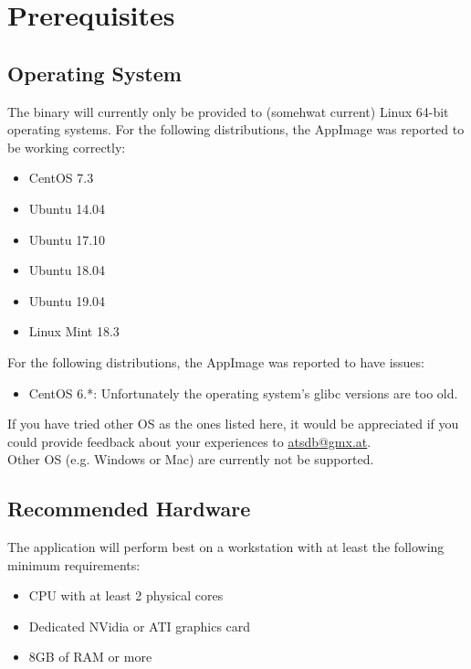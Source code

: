\section{Prerequisites}

\subsection{Operating System}

The binary will currently only be provided to (somehwat current) Linux 64-bit operating systems. For the following distributions, the AppImage was reported to be working correctly:

\begin{itemize}  
\item CentOS 7.3
\item Ubuntu 14.04
\item Ubuntu 17.10
\item Ubuntu 18.04
\item Ubuntu 19.04
\item Linux Mint 18.3
\end{itemize}

For the following distributions, the AppImage was reported to have issues:

\begin{itemize}  
\item CentOS 6.*: Unfortunately the operating system's glibc versions are too old.
\end{itemize}

If you have tried other OS as the ones listed here, it would be appreciated if you could provide feedback about your experiences to \href{mailto:atsdb@gmx.at}{atsdb@gmx.at}.\\

Other OS (e.g. Windows or Mac) are currently not be supported.

\subsection{Recommended Hardware}

The application will perform best on a workstation with at least the following minimum requirements:

\begin{itemize}  
\item CPU with at least 2 physical cores
\item Dedicated NVidia or ATI graphics card
\item 8GB of RAM or more
\end{itemize}


